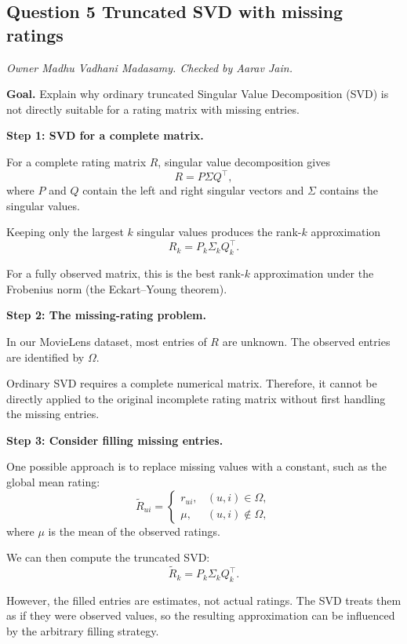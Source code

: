 \subsection*{Question 5 Truncated SVD with missing ratings}
\textit{Owner Madhu Vadhani Madasamy. Checked by Aarav Jain.}

\textbf{Goal.} Explain why ordinary truncated Singular
Value Decomposition (SVD) is not directly suitable for
a rating matrix with missing entries.

\textbf{Step 1: SVD for a complete matrix.}

For a complete rating matrix $R$, singular value
decomposition gives
\[
R=P\Sigma Q^\top,
\]
where $P$ and $Q$ contain the left and right singular
vectors and $\Sigma$ contains the singular values.

Keeping only the largest $k$ singular values produces
the rank-$k$ approximation
\[
R_k=P_k\Sigma_k Q_k^\top.
\]

For a fully observed matrix, this is the best rank-$k$
approximation under the Frobenius norm (the Eckart--Young
theorem).

\textbf{Step 2: The missing-rating problem.}

In our MovieLens dataset, most entries of $R$ are
unknown. The observed entries are identified by
$\Omega$.

Ordinary SVD requires a complete numerical matrix.
Therefore, it cannot be directly applied to the original
incomplete rating matrix without first handling the
missing entries.

\textbf{Step 3: Consider filling missing entries.}

One possible approach is to replace missing values with
a constant, such as the global mean rating:
\[
\widetilde R_{ui}=
\begin{cases}
r_{ui}, & (u,i)\in\Omega,\\
\mu, & (u,i)\notin\Omega,
\end{cases}
\]
where $\mu$ is the mean of the observed ratings.

We can then compute the truncated SVD:
\[
\widetilde R_k=P_k\Sigma_kQ_k^\top.
\]

However, the filled entries are estimates, not actual
ratings. The SVD treats them as if they were observed
values, so the resulting approximation can be influenced
by the arbitrary filling strategy.

